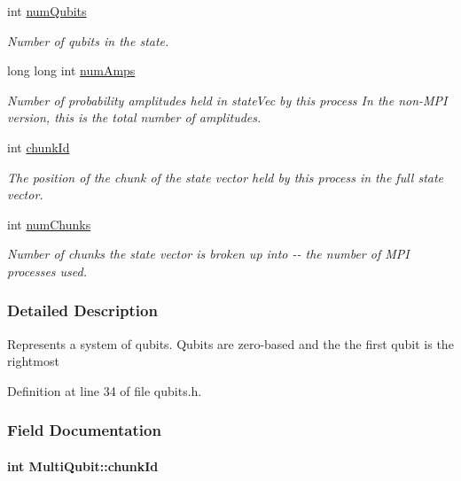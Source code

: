 \begin{DoxyCompactItemize}
\item 
int \hyperlink{structMultiQubit_ab5b9795bdc6fb5855e1974dcbbaeb36f}{numQubits}
\begin{DoxyCompactList}\small\item\em Number of qubits in the state. \item\end{DoxyCompactList}\item 
long long int \hyperlink{structMultiQubit_ae16f47d8b725c914fb7f66b6498d79db}{numAmps}
\begin{DoxyCompactList}\small\item\em Number of probability amplitudes held in stateVec by this process In the non-\/MPI version, this is the total number of amplitudes. \item\end{DoxyCompactList}\item 
int \hyperlink{structMultiQubit_ab10c88249fa3825d6227ceec01d37e37}{chunkId}
\begin{DoxyCompactList}\small\item\em The position of the chunk of the state vector held by this process in the full state vector. \item\end{DoxyCompactList}\item 
int \hyperlink{structMultiQubit_acd43f2f57991709c9e94f73662c972b2}{numChunks}
\begin{DoxyCompactList}\small\item\em Number of chunks the state vector is broken up into -\/-\/ the number of MPI processes used. \item\end{DoxyCompactList}\end{DoxyCompactItemize}


\subsubsection{Detailed Description}
Represents a system of qubits. Qubits are zero-\/based and the the first qubit is the rightmost 

Definition at line 34 of file qubits.h.

\subsubsection{Field Documentation}
\hypertarget{structMultiQubit_ab10c88249fa3825d6227ceec01d37e37}{
\paragraph[{chunkId}]{\setlength{\rightskip}{0pt plus 5cm}int {\bf MultiQubit::chunkId}}\hfill}
\label{structMultiQubit_ab10c88249fa3825d6227ceec01d37e37}


